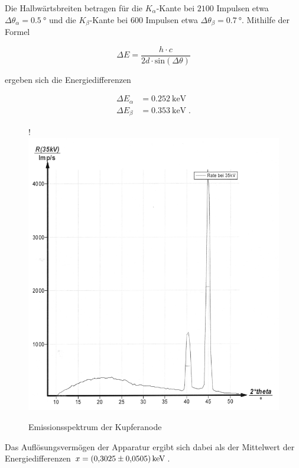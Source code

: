 Die Halbwärtsbreiten betragen für die $K_\alpha$-Kante bei $2100$ Impulsen
etwa $\Delta \theta_\alpha = \SI{0.5}{\degree}$ und die $K_\beta$-Kante bei $600$ Impulsen
etwa $\Delta \theta_\beta = \SI{0.7}{\degree}$.
Mithilfe der Formel

\begin{equation}
  \Delta E = \frac{h \cdot c}{2d \cdot \text{sin}\left(\Delta \theta \right)}
\end{equation}

ergeben sich die Energiedifferenzen 

\begin{align*}
  \Delta E_\alpha &= \SI{0.252}{\kilo\eV} \\
  \Delta E_\beta &= \SI{0.353}{\kilo\eV}  \; .
\end{align*}

\begin{figure}[H]!
  \centering
  \includegraphics[scale=0.3]{content/bild2.png}
  \caption{Emissionsspektrum der Kupferanode}
  \label{fig:plot2}
\end{figure}

Das Auflösungsvermögen der Apparatur ergibt sich dabei als der Mittelwert der 
Energiedifferenzen $ x = \SI{0.3025 +- 0.0505}{\kilo\eV}$.

